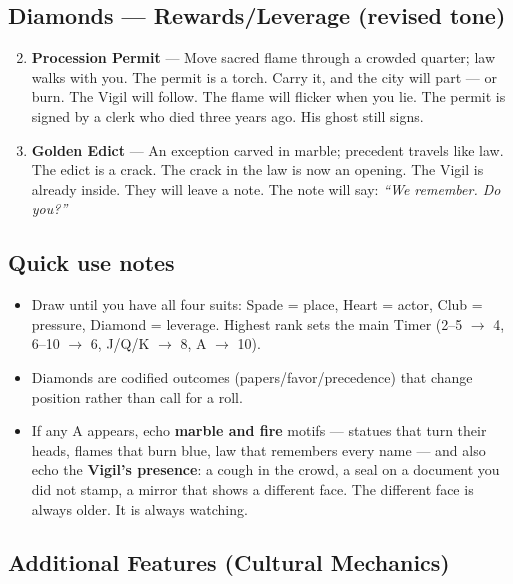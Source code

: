 \subsection*{Diamonds --- Rewards/Leverage (revised tone)}
\begin{enumerate}
\setcounter{enumi}{1}
\item \textbf{Procession Permit} --- Move sacred flame through a crowded quarter; law walks with you. The permit is a torch. Carry it, and the city will part --- or burn. The Vigil will follow. The flame will flicker when you lie. The permit is signed by a clerk who died three years ago. His ghost still signs.
\item \textbf{Golden Edict} --- An exception carved in marble; precedent travels like law. The edict is a crack. The crack in the law is now an opening. The Vigil is already inside. They will leave a note. The note will say: \textit{``We remember. Do you?''}
\end{enumerate}

\subsection*{Quick use notes}
\begin{itemize}
\item Draw until you have all four suits: Spade = place, Heart = actor, Club = pressure, Diamond = leverage. Highest rank sets the main Timer (2--5 $\rightarrow$ 4, 6--10 $\rightarrow$ 6, J/Q/K $\rightarrow$ 8, A $\rightarrow$ 10).
\item Diamonds are codified outcomes (papers/favor/precedence) that change position rather than call for a roll.
\item If any A appears, echo \textbf{marble and fire} motifs --- statues that turn their heads, flames that burn blue, law that remembers every name --- and also echo the \textbf{Vigil's presence}: a cough in the crowd, a seal on a document you did not stamp, a mirror that shows a different face. The different face is always older. It is always watching.
\end{itemize}

\subsection*{Additional Features (Cultural Mechanics)}
\label{sec:ecktoria-mechanics}

